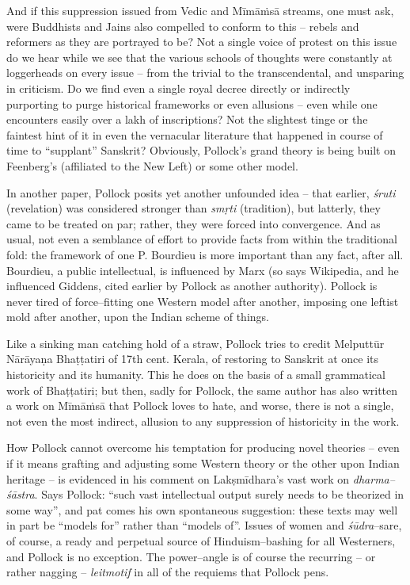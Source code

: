 And if this suppression issued from Vedic and Mīmāṁsā streams, one must ask, were Buddhists and Jains also compelled to conform to this – rebels and reformers as they are portrayed to be? Not a single voice of protest on this issue do we hear while we see that the various schools of thoughts were constantly at loggerheads on every issue – from the trivial to the transcendental, and unsparing in criticism. Do we find even a single royal decree directly or indirectly purporting to purge historical frameworks or even allusions – even while one encounters easily over a lakh of inscriptions? Not the slightest tinge or the faintest hint of it in even the vernacular literature that happened in course of time to “supplant” Sanskrit? Obviously, Pollock’s grand theory is being built on Feenberg’s (affiliated to the New Left) or some other model.

In another paper, Pollock posits yet another unfounded idea – that earlier, \textit{śruti} (revelation) was considered stronger than \textit{smṛti} (tradition), but latterly, they came to be treated on par; rather, they were forced into convergence. And as usual, not even a semblance of effort to provide facts from within the traditional fold: the framework of one P. Bourdieu is more important than any fact, after all. Bourdieu, a public intellectual, is influenced by Marx (so says Wikipedia, and he influenced Giddens, cited earlier by Pollock as another authority). Pollock is never tired of force–fitting one Western model after another, imposing one leftist mold after another, upon the Indian scheme of things.

Like a sinking man catching hold of a straw, Pollock tries to credit Melputtūr Nārāyaṇa Bhaṭṭatiri of 17th cent. Kerala, of restoring to Sanskrit at once its historicity and its humanity. This he does on the basis of a small grammatical work of Bhaṭṭatiri; but then, sadly for Pollock, the same author has also written a work on Mīmāṁsā that Pollock loves to hate, and worse, there is not a single, not even the most indirect, allusion to any suppression of historicity in the work.

How Pollock cannot overcome his temptation for producing novel theories – even if it means grafting and adjusting some Western theory or the other upon Indian heritage – is evidenced in his comment on Lakṣmīdhara’s vast work on \textit{dharma–śāstra}. Says Pollock: “such vast intellectual output surely needs to be theorized in some way”, and pat comes his own spontaneous suggestion: these texts may well in part be “models for” rather than “models of”. Issues of women and \textit{śūdra}–s\break are, of course, a ready and perpetual source of Hinduism–bashing for all Westerners, and Pollock is no exception. The power–angle is of course the recurring – or rather nagging – \textit{leitmotif} in all of the requiems that Pollock pens.

